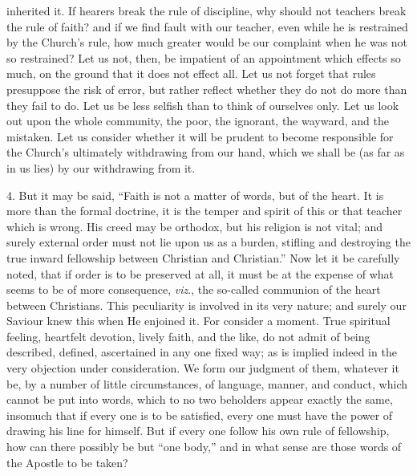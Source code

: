 inherited it. If hearers break the rule of discipline, why should not
teachers break the rule of faith? and if we find fault with our
teacher, even while he is restrained by the Church's rule, how much
greater would be our complaint when he was not so restrained? Let us
not, then, be impatient of an appointment which effects so much, on
the ground that it does not effect all. Let us not forget that rules
presuppose the risk of error, but rather reflect whether they do not
do more than they fail to do. Let us be less selfish than to think of
ourselves only. Let us look out upon the whole community, the poor,
the ignorant, the wayward, and the mistaken. Let us consider whether
it will be prudent to become responsible for the Church's ultimately
withdrawing from our hand, which we shall be (as far as in us lies) by
our withdrawing from it.

4. But it may be said, ``Faith is not a matter of words, but of
the heart. It is more than the formal doctrine, it is the temper and
spirit of this or that teacher which is wrong. His creed may be
orthodox, but his religion is not vital; and surely external order
must not lie upon us as a burden, stifling and destroying the true
inward fellowship between Christian and Christian.'' Now let it be
carefully noted, that if order is to be preserved at all, it must be
at the expense of what seems to be of more consequence, \emph{viz}.,
the so-called communion of the heart between Christians. This
peculiarity is involved in its very nature; and surely our Saviour
knew this when He enjoined it. For consider a moment. True spiritual
feeling, heartfelt devotion, lively faith, and the like, do not admit
of being described, defined, ascertained in any one fixed way; as is
implied indeed in the very objection under consideration. We form our
judgment of them, whatever it be, by a number of little circumstances,
of language, manner, and conduct, which cannot be put into words,
which to no two beholders appear exactly the same, insomuch that if
every one is to be satisfied, every one must have the power of drawing
his line for himself. But if every one follow his own rule of
fellowship, how can there possibly be but ``one body,'' and in
what sense are those words of the Apostle to be taken?

